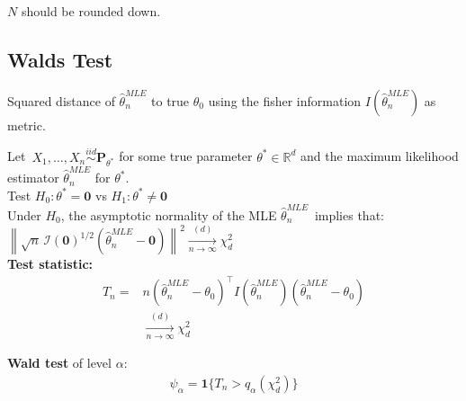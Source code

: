$N$ should be rounded down.

\subsection{Walds Test}

Squared distance of $\widehat{\theta}_ n^{MLE}$ to true $\theta_0$ using the fisher information $I(\widehat{\theta}_ n^{MLE})$ as metric.

Let $\, X_1, \ldots , X_ n \stackrel{iid}{\sim } \mathbf{P}_{\theta ^*}$ for some true parameter $\theta ^* \in \mathbb {R}^ d$ and the  maximum likelihood estimator $\widehat{\theta }_ n^{MLE}$ for $\theta ^*$.\\

Test $H_0: \displaystyle  \theta ^* = \mathbf{0}$ vs $H_1: \displaystyle  \theta ^* \neq \mathbf{0}$\\

Under $H_0$, the asymptotic normality of the MLE $\widehat{\theta }_ n^{MLE}\,$ implies that:\\

$\left\lVert \sqrt{n}\, \mathcal{I}(\mathbf{0})^{1/2}(\widehat{\theta }_ n^{MLE}- \mathbf{0}) \right\rVert ^2 \xrightarrow [n\to \infty ]{(d)} \chi ^2_ d\,$\\

\textbf{Test statistic:}
\begin{align*}
T_n = &
n(\widehat{\theta}_ n^{MLE} - \theta_0)^\top I(\widehat{\theta}_ n^{MLE}) (\widehat{\theta}_ n^{MLE} - \theta_0)\\
&\xrightarrow [n\to \infty ]{(d)} \chi ^2_ d
\end{align*}

\textbf{Wald test} of level $\alpha$:
\begin{align*}
\psi_\alpha = \mathbf{1}\{T_n > q_\alpha(\chi^2_d)\}
\end{align*}
 	 		 	 
%
%

